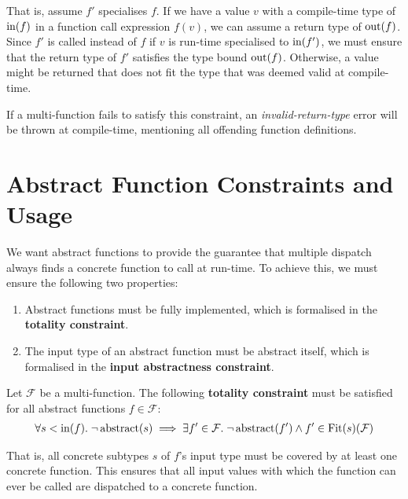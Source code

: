 \noindent That is, assume $f'$ specialises $f$. If we have a value $v$ with a compile-time type of $\operatorname{in}(f)$ in a function call expression $f(v)$, we can assume a return type of $\operatorname{out}(f)$. Since $f'$ is called instead of $f$ if $v$ is run-time specialised to $\operatorname{in}(f')$, we must ensure that the return type of $f'$ satisfies the type bound $\operatorname{out}(f)$. Otherwise, a value might be returned that does not fit the type that was deemed valid at compile-time.

If a multi-function fails to satisfy this constraint, an \textit{invalid-return-type} error will be thrown at compile-time, mentioning all offending function definitions.



\section{Abstract Function Constraints and Usage} \label{section:abstract-function-constraints}

We want abstract functions to provide the guarantee that multiple dispatch always finds a concrete function to call at run-time. To achieve this, we must ensure the following two properties:
\begin{enumerate}
	\item Abstract functions must be fully implemented, which is formalised in the \textbf{totality constraint}.
	\item The input type of an abstract function must be abstract itself, which is formalised in the \textbf{input abstractness constraint}.
\end{enumerate}

\begin{definition} \label{def:totality-constraint}
	Let $\mathcal{F}$ be a multi-function. The following \textbf{totality constraint} must be satisfied for all abstract functions $f \in \mathcal{F}$:
	\begin{align*}
		\forall s < \operatorname{in}(f).\; \neg \operatorname{abstract}(s) \implies \exists f' \in \mathcal{F}.\; \neg \operatorname{abstract}(f') \land f' \in \operatorname{Fit}(s)(\mathcal{F})
	\end{align*}
\end{definition}

\noindent That is, all concrete subtypes $s$ of $f$'s input type must be covered by at least one concrete function. This ensures that all input values with which the function can ever be called are dispatched to a concrete function.

